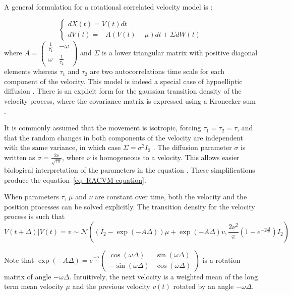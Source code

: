 \documentclass[11pt]{article}
\newcommand {\1}{\mathbb{1}}
\begin{document}
A general formulation for a rotational correlated velocity model is \cite{albertsen_generalizing_2018}:

\begin{equation} \left\{
	\begin{array}{l}
		dX(t)=V(t) dt \\
		dV(t)=-A(V(t)-\mu)dt+\Sigma dW(t) 
	
	\end{array}
	\right.
	\label{eq: general RACVM equation}
\end{equation}
where $A=\begin{pmatrix} 
	\frac{1}{\tau_1} & -\omega \\
	\omega & \frac{1}{\tau_2}
\end{pmatrix}$ and $\Sigma$ is a lower triangular matrix with positive diagonal elements whereas $\tau_1$ and $\tau_2$ are two autocorrelations time scale for each component of the velocity. This model is indeed a special case of hypoelliptic diffusion \cite{ditlevsen_hypoelliptic_2019}.
There is an explicit form for the gaussian transition density of the velocity process, where the covariance matrix is expressed using a Kronecker sum \cite{albertsen_generalizing_2018}.

It is commonly assumed that the movement is isotropic, forcing $\tau_1=\tau_2=\tau$, and that the random changes in both components of the velocity are independent with the same variance, in which case $\Sigma=\sigma^2 I_2$ \cite{johnson_continuoustime_2008}.
The diffusion parameter $\sigma$ is written as $\sigma=\frac{2\nu}{\sqrt{\tau \pi}}$, where $\nu$ is homogeneous to a velocity. This allows easier biological interpretation  of the parameters in the equation \cite{gurarie_correlated_2017}. These simplifications produce the equation~\ref{eq: RACVM equation}.

When parameters $\tau$, $\mu$ and $\nu$ are constant over time, both the velocity and the position processes can be solved explicitly.
The transition density for the velocity process is such that 
\begin{equation}V(t+\Delta) \vert V(t)=v \sim \mathcal{N}\left( (I_2-\exp(-A\Delta))\mu + \exp(-A\Delta)v, \frac{2\nu^2}{\pi}(1-e^{-2\frac{\Delta}{\tau}}) I_2 \right) 
\end{equation}


Note that $\exp(-A\Delta)=e^{\frac{-\Delta}{\tau}} \begin{pmatrix} \cos(\omega \Delta) & \sin(\omega \Delta) \\ -\sin(\omega \Delta) & \cos(\omega \Delta) \end{pmatrix}$ is a rotation matrix of angle $-\omega \Delta$.
Intuitively, the next velocity is a weighted mean of the long term mean velocity $\mu$ and the previous velocity $v(t)$ rotated by an angle $-\omega \Delta$.
\end{document}
